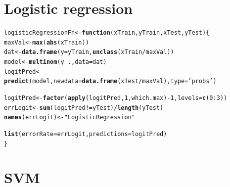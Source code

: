 \documentclass[a4paper,draft=false]{scrreprt}\usepackage[]{graphicx}\usepackage[]{color}
\makeatletter
\newcommand{\hlnum}[1]{\textcolor[rgb]{0.686,0.059,0.569}{#1}}%
\newcommand{\hlstr}[1]{\textcolor[rgb]{0.192,0.494,0.8}{#1}}%
\newcommand{\hlopt}[1]{\textcolor[rgb]{0,0,0}{#1}}%
\newcommand{\hlstd}[1]{\textcolor[rgb]{0.345,0.345,0.345}{#1}}%
\newcommand{\hlkwa}[1]{\textcolor[rgb]{0.161,0.373,0.58}{\textbf{#1}}}%
\newcommand{\hlkwb}[1]{\textcolor[rgb]{0.69,0.353,0.396}{#1}}%
\newcommand{\hlkwc}[1]{\textcolor[rgb]{0.333,0.667,0.333}{#1}}%
\newcommand{\hlkwd}[1]{\textcolor[rgb]{0.737,0.353,0.396}{\textbf{#1}}}%
\newenvironment{kframe}{%
 \def\at@end@of@kframe{}%
 \ifinner\ifhmode%
  \def\at@end@of@kframe{\end{minipage}}%
  \begin{minipage}{\columnwidth}%
 \fi\fi%
 \def\FrameCommand##1{\hskip\@totalleftmargin \hskip-\fboxsep
 \colorbox{shadecolor}{##1}\hskip-\fboxsep
     \hskip-\linewidth \hskip-\@totalleftmargin \hskip\columnwidth}%
 \MakeFramed {\advance\hsize-\width
   \@totalleftmargin\z@ \linewidth\hsize
   \@setminipage}}%
 {\par\unskip\endMakeFramed%
 \at@end@of@kframe}
\newenvironment{knitrout}{}{} %
\makeatother
\begin{document}
\section{Logistic regression} %
\begin{knitrout}
\color{fgcolor}\begin{kframe}
\begin{alltt}
\hlstd{logisticRegressionFn} \hlkwb{<-} \hlkwa{function}\hlstd{(}\hlkwc{xTrain}\hlstd{,} \hlkwc{yTrain}\hlstd{,} \hlkwc{xTest}\hlstd{,} \hlkwc{yTest}\hlstd{)\{}
    \hlstd{maxVal} \hlkwb{<-} \hlkwd{max}\hlstd{(}\hlkwd{abs}\hlstd{(xTrain))}
    \hlstd{dat} \hlkwb{<-} \hlkwd{data.frame}\hlstd{(}\hlkwc{y} \hlstd{= yTrain,} \hlkwd{unclass}\hlstd{(xTrain}\hlopt{/}\hlstd{maxVal))}
    \hlstd{model} \hlkwb{<-} \hlkwd{multinom}\hlstd{(y} \hlopt{~} \hlstd{.,} \hlkwc{data} \hlstd{= dat)}
    \hlstd{logitPred} \hlkwb{<-} \hlkwd{predict}\hlstd{(model,} \hlkwc{newdata}\hlstd{=} \hlkwd{data.frame}\hlstd{(xTest}\hlopt{/}\hlstd{maxVal),} \hlkwc{type}\hlstd{=}\hlstr{'probs'}\hlstd{)}

    \hlstd{logitPred} \hlkwb{<-} \hlkwd{factor}\hlstd{(}\hlkwd{apply}\hlstd{(logitPred,} \hlnum{1}\hlstd{, which.max)} \hlopt{-} \hlnum{1}\hlstd{,} \hlkwc{levels} \hlstd{=} \hlkwd{c}\hlstd{(}\hlnum{0}\hlopt{:}\hlnum{3}\hlstd{))}
    \hlstd{errLogit} \hlkwb{<-} \hlkwd{sum}\hlstd{(logitPred} \hlopt{!=} \hlstd{yTest)} \hlopt{/} \hlkwd{length}\hlstd{(yTest)}
    \hlkwd{names}\hlstd{(errLogit)} \hlkwb{<-} \hlstr{"LogisticRegression"}

    \hlkwd{list}\hlstd{(}\hlkwc{errorRate} \hlstd{= errLogit,} \hlkwc{predictions} \hlstd{= logitPred)}
\hlstd{\}}
\end{alltt}
\end{kframe}
\end{knitrout}

\section{SVM} %
\end{document}
